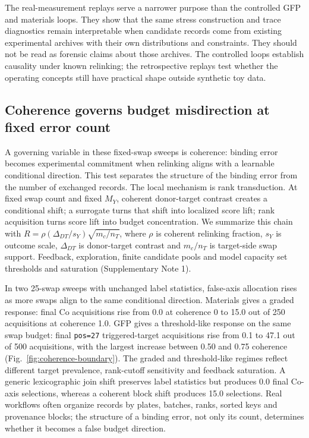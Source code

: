The real-measurement replays serve a narrower purpose than the controlled GFP and materials loops. They show that the same stress construction and trace diagnostics remain interpretable when candidate records come from existing experimental archives with their own distributions and constraints. They should not be read as forensic claims about those archives. The controlled loops establish causality under known relinking; the retrospective replays test whether the operating concepts still have practical shape outside synthetic toy data.

\subsection*{Coherence governs budget misdirection at fixed error count}
A governing variable in these fixed-swap sweeps is coherence: binding error becomes experimental commitment when relinking aligns with a learnable conditional direction. This test separates the structure of the binding error from the number of exchanged records. The local mechanism is rank transduction. At fixed swap count and fixed \(M_Y\), coherent donor-target contrast creates a conditional shift; a surrogate turns that shift into localized score lift; rank acquisition turns score lift into budget concentration. We summarize this chain with \(R=\rho(\Delta_{DT}/s_Y)\sqrt{m_c/n_T}\), where \(\rho\) is coherent relinking fraction, \(s_Y\) is outcome scale, \(\Delta_{DT}\) is donor-target contrast and \(m_c/n_T\) is target-side swap support. Feedback, exploration, finite candidate pools and model capacity set thresholds and saturation (Supplementary Note 1).

In two 25-swap sweeps with unchanged label statistics, false-axis allocation rises as more swaps align to the same conditional direction. Materials gives a graded response: final Co acquisitions rise from 0.0 at coherence 0 to 15.0 out of 250 acquisitions at coherence 1.0. GFP gives a threshold-like response on the same swap budget: final \texttt{pos=27} triggered-target acquisitions rise from 0.1 to 47.1 out of 500 acquisitions, with the largest increase between 0.50 and 0.75 coherence (Fig.~\ref{fig:coherence-boundary}). The graded and threshold-like regimes reflect different target prevalence, rank-cutoff sensitivity and feedback saturation. A generic lexicographic join shift preserves label statistics but produces 0.0 final Co-axis selections, whereas a coherent block shift produces 15.0 selections. Real workflows often organize records by plates, batches, ranks, sorted keys and provenance blocks; the structure of a binding error, not only its count, determines whether it becomes a false budget direction.

